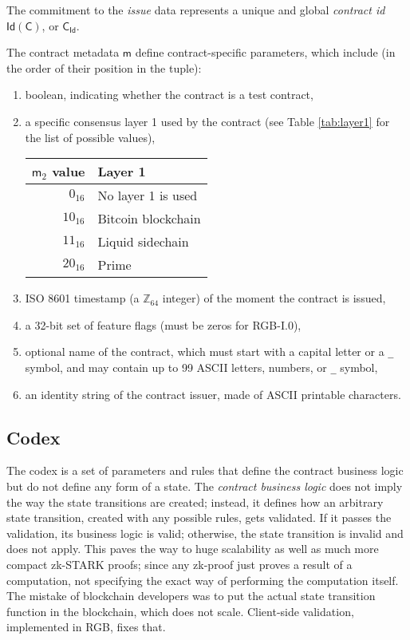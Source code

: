 \documentclass[9pt,oneside]{amsart}
\newenvironment{coltable}
  {\par\bigskip\noindent\minipage{\columnwidth}\centering}
  {\endminipage\par\bigskip}
\begin{document}
\begin{multicols}{2}

The commitment to the \emph{issue} data represents a unique and global \emph{contract id}
$\mathsf{Id}(\mathsf{C})$, or $\mathsf{C_{Id}}$.

The contract metadata $\mathsf{m}$ define contract-specific parameters, which include
(in the order of their position in the tuple):

\begin{enumerate}
\item boolean, indicating whether the contract is a test contract,
\item a specific consensus layer 1 used by the contract
  (see Table \ref{tab:layer1} for the list of possible values),

\begin{coltable}
\label{tab:layer1}
\begin{tabular}{r l}
\toprule
$\mathsf{m}_2$ value & Layer 1 \\
\midrule
$0_{16}$ & No layer 1 is used \\
$10_{16}$ & Bitcoin blockchain \cite{Bitcoin} \\
$11_{16}$ & Liquid sidechain \cite{Liquid} \\
$20_{16}$ & Prime \cite{Prime} \\
\bottomrule
\end{tabular}
\end{coltable}

\item ISO 8601 timestamp (a $\mathbb{Z}_{64}$ integer) of the moment the contract is issued,
\item a 32-bit set of feature flags (must be zeros for RGB-I.0),
\item optional name of the contract, which must start with a capital letter or a \texttt{\_} symbol,
  and may contain up to 99 ASCII letters, numbers, or \texttt{\_} symbol,
\item an identity string of the contract issuer, made of ASCII printable characters.
\end{enumerate}

\subsection{Codex}\label{Codex}

The codex is a set of parameters and rules that define the contract business logic
but do not define any form of a state. The \emph{contract business logic} does not imply
the way the state transitions are created; instead, it defines how an arbitrary
state transition, created with any possible rules, gets validated. If it passes the validation,
its business logic is valid; otherwise, the state transition is invalid and does not apply.
This paves the way to huge scalability as well as much more compact zk-STARK proofs;
since any zk-proof just proves a result of a computation,
not specifying the exact way of performing the computation itself.
The mistake of blockchain developers was to put the actual state transition function in
the blockchain, which does not scale. Client-side validation, implemented in RGB, fixes that.


\end{multicols}
\end{document}

